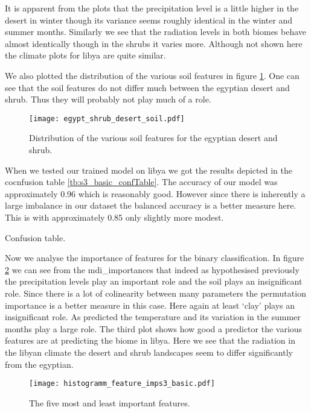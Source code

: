 It is apparent from the plots that the precipitation level is a little higher in the desert in winter though its variance seems roughly identical
in the winter and summer months.
Similarly we see that the radiation levels in both biomes behave almost identically though in the shrubs it varies more. 
Although not shown here the climate plots for libya are quite similar.

We also plotted the distribution of the various soil features in figure \ref{pl:egypt_shrub_desert_soil}.
One can see that the soil features do not differ much between the egyptian desert and shrub. Thus they will
probably not play much of a role.
\begin{figure}[h]
  \centering
  \texttt{[image: egypt\_shrub\_desert\_soil.pdf]}
  \caption{Distribution of the various soil features for the egyptian desert and shrub.}
  \label{pl:egypt_shrub_desert_soil}
\end{figure}

When we tested our trained model on libya we got the results depicted in the cocnfusion table 
\ref{tb:s3_basic_confTable}. The accuracy of our model was approximately 0.96 which is reasonably good. However since there is inherently a
large imbalance in our dataset the balanced accuracy is a better measure here. This is with approximately 0.85 only slightly more modest.
\begin{table}[h]
  \centering
  
  \caption{Confusion table.}
  \label{tb:s3_basic_confTable}
\end{table}

Now we analyse the importance of features for the binary classification.
In figure \ref{pl:histogramm_feature_imps3_basic} we can see 
from the mdi\_importances  that indeed as hypothesised previously
the precipitation levels play an important role and the soil plays an insignificant role. Since there is a lot of
colinearity between many parameters the permutation importance is a better measure in this case.
Here again at least `clay' plays an insignificant role. As predicted the temperature and its variation in the
summer months play a large role. The third plot shows how good a predictor the various features are at predicting the
biome in libya. Here we see that the radiation in the libyan climate the desert and shrub landscapes 
seem to differ significantly from the egyptian. 
\begin{figure}
  \centering
  \texttt{[image: histogramm\_feature\_imps3\_basic.pdf]}
  \caption{The five most and least important features.}
  \label{pl:histogramm_feature_imps3_basic}
\end{figure}

